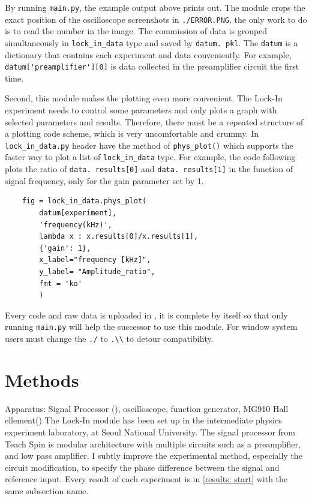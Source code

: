 \documentclass{article}
\begin{document}
 By running \verb|main.py|, the example output above prints out.
 The module crops the exact position of the oscilloscope screenshots in \verb|./ERROR.PNG|, the only work to do is to read the number in the image.
 The commission of data is grouped simultaneously in \verb|lock_in_data| type and saved by \verb|datum. pkl|.
 The \verb|datum| is a dictionary that contains each experiment and data conveniently.
 For example, \verb|datum['preamplifier'][0]| is data collected in the preamplifier circuit the first time.

 Second, this module makes the plotting even more convenient.
 The Lock-In experiment needs to control some parameters and only plots a graph with selected parameters and results.
 Therefore, there must be a repeated structure of a plotting code scheme, which is very uncomfortable and crummy.
 In \verb|lock_in_data.py| header have the method of \verb|phys_plot()| which supports the faster way to plot a list of \verb|lock_in_data| type.
 For example, the code following plots the ratio of \verb|data. results[0]| and \verb|data. results[1]| in the function of signal frequency, only for the gain parameter set by 1.

 \begin{verbatim}
    fig = lock_in_data.phys_plot(
        datum[experiment],
        'frequency(kHz)',
        lambda x : x.results[0]/x.results[1], 
        {'gain': 1},
        x_label="frequency [kHz]",
        y_label= "Amplitude_ratio",
        fmt = 'ko'
        )    
 \end{verbatim}

 Every code and raw data is uploaded in \cite{github}, it is complete by itself so that only running \verb|main.py| will help the successor to use this module.
 For window system users must change the \verb|./| to \verb|.\\| to detour compatibility.

\section{Methods}
\label{methods: start}
Apparatus: Signal Processor (\cite{signal_processor}), oscilloscope, function generator, MG910 Hall ellement(\cite{hall_sensor})
The Lock-In module has been set up in the intermediate physics experiment laboratory, at Seoul National University.
The signal processor from Teach Spin is modular architecture with multiple circuits such as a preamplifier, and low pass amplifier.
I subtly improve the experimental method, especially the circuit modification, to specify the phase difference between the signal and reference input.
Every result of each experiment is in \ref{results: start} with the same subsection name.
\end{document}
